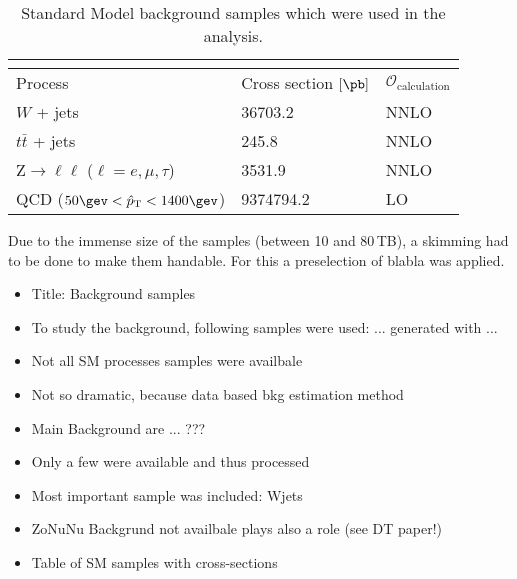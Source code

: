 \renewcommand{\arraystretch}{1.5}
\begin{table}[!t]
\centering
\caption{Standard Model background samples which were used in the analysis.}
\label{tab:SMsamples}
\begin{tabular}{l|l|l}
\multicolumn{3}{c}{} \\
\hline
 Process & Cross section $\left[\pb\right]$ & $\mathcal{O}_{\text{calculation}}$ \\%
\hline
 $W$ + jets                                &  36703.2   &  NNLO \cite{bib:FEWZ} \\%
 $t\bar{t}$ + jets                         &  245.8    &  NNLO \cite{bib:ttbar:Czakon_2013}\\%
 Z$\rightarrow\ell\ell$ ($\ell=e,\mu,\tau$) &  3531.9    &  NNLO \cite{bib:FEWZ} \\%
 QCD ($50\gev<\hat{p}_{\text{T}}<1400\gev$)                &  9374794.2 &  LO  \\%
\hline
\end{tabular}
\end{table}  

Due to the immense size of the samples (between 10 and 80\,TB), a skimming had to be done to make them handable.
For this a preselection of blabla was applied.

\begin{itemize}
\item Title: Background samples
\item To study the background, following samples were used: ... generated with ...
\item Not all SM processes samples were availbale
\item Not so dramatic, because data based bkg estimation method
\item Main Background are ... ???
\item Only a few were available and thus processed
\item Most important sample was included: Wjets
\item ZoNuNu Backgrund not availbale plays also a role (see DT paper!)
\item Table of SM samples with cross-sections
\end{itemize}

